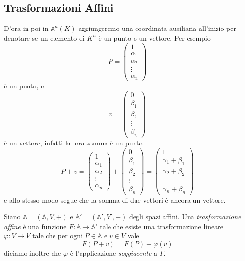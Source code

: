 \documentclass[11pt]{scrartcl}
\renewcommand{\AA}{\mathbb{A}}
\begin{document}
   	 \subsection{Trasformazioni Affini}
   	 
   	 D'ora in poi in $\AA^n(K)$ aggiungeremo una coordinata ausiliaria all'inizio per denotare se un elemento di $K^n$ è un punto o un vettore. Per esempio
   	 $$
   	 P=\begin{pmatrix}
   	 	1 \\
   	 	\alpha_1 \\
   	 	\alpha_2 \\
   	 	\vdots \\
   	 	\alpha_n
   	 \end{pmatrix}
   	 $$
   	 è un punto, e 
   	 $$
   	 v=\begin{pmatrix}
   	 	0 \\
   	 	\beta_1 \\
   	 	\beta_2 \\
   	 	\vdots \\
   	 	\beta_n 
   	 \end{pmatrix}
   	 $$
   	 è un vettore, infatti la loro somma è un punto
   	 $$
   	 P+v=
   	 \begin{pmatrix}
   	 	1 \\
   	 	\alpha_1 \\
   	 	\alpha_2 \\
   	 	\vdots \\
   	 	\alpha_n
   	 \end{pmatrix}
   	 +
   	 \begin{pmatrix}
   	 	0 \\
   	 	\beta_1 \\
   	 	\beta_2 \\
   	 	\vdots \\
   	 	\beta_n 
   	 \end{pmatrix}
   	 =
   	 \begin{pmatrix}
   	 	1 \\
   	 	\alpha_1 + \beta_1 \\
   	 	\alpha_2 + \beta_2 \\
   	 	\vdots \\
   	 	\alpha_n+\beta_n
   	 \end{pmatrix}
   	 $$
   	 e allo stesso modo segue che la somma di due vettori è ancora un vettore.
   	 \begin{definition}
   	 	Siano $\mathbb{A}=(\mathbb{A},V,+)$ e $\mathbb{A}'=(\mathbb{A}',V',+)$ degli spazi affini. Una \textit{trasformazione affine} è una funzione $F:\mathbb{A}\to\mathbb{A}'$ tale che esiste una trasformazione lineare $\varphi:V\to V$ tale che per ogni $P\in \mathbb{A}$ e $v\in V$ vale
   	 	$$F(P+v)=F(P)+\varphi(v)$$
   	 	diciamo inoltre che $\varphi$ è l'applicazione \textit{soggiacente} a $F$.
   	 \end{definition}
\end{document}
